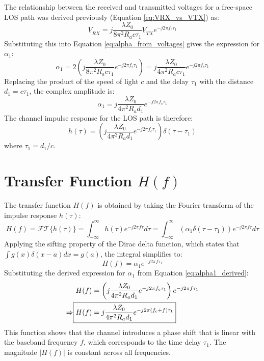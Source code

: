The relationship between the received and transmitted voltages for a free-space LOS path was derived previously (Equation \ref{eq:VRX_vs_VTX}) as:
\begin{equation}
	\underline{V}_{RX} = j \frac{\lambda Z_0}{8\pi^2 R_a c\tau_1} \underline{V}_{TX} e^{-j2\pi f_c \tau_1}
\end{equation}
Substituting this into Equation \eqref{eq:alpha_from_voltages} gives the expression for $\alpha_1$:
\begin{equation}
	\alpha_1 = 2 \left( j \frac{\lambda Z_0}{8\pi^2 R_a c\tau_1} e^{-j2\pi f_c \tau_1} \right) = j \frac{\lambda Z_0}{4\pi^2 R_a c\tau_1} e^{-j2\pi f_c \tau_1}
\end{equation}
Replacing the product of the speed of light $c$ and the delay $\tau_1$ with the distance $d_1 = c\tau_1$, the complex amplitude is:
\begin{equation}
	\alpha_1 = j \frac{\lambda Z_0}{4\pi^2 R_a d_1} e^{-j2\pi f_c \tau_1}
	\label{eq:alpha1_derived}
\end{equation}
The channel impulse response for the LOS path is therefore:
\begin{equation}
	\boxed{h(\tau) = \left( j \frac{\lambda Z_0}{4\pi^2 R_a d_1} e^{-j2\pi f_c \tau_1} \right) \delta(\tau - \tau_1)}
	\label{eq:los_impulse_response_derived_detailed}
\end{equation}
where $\tau_1 = d_1/c$.

\section{Transfer Function $H(f)$}
The transfer function $H(f)$ is obtained by taking the Fourier transform of the impulse response $h(\tau)$:
\begin{equation}
	H(f) = \mathcal{FT}\{ h(\tau)\} =  \int_{-\infty}^{\infty} h(\tau) e^{-j2\pi f \tau} d\tau = \int_{-\infty}^{\infty} \left( \alpha_1 \delta(\tau - \tau_1) \right) e^{-j2\pi f \tau} d\tau
\end{equation}
Applying the sifting property of the Dirac delta function, which states that $\int g(x)\delta(x-a)dx = g(a)$, the integral simplifies to:
\begin{equation}
	H(f) = \alpha_1 e^{-j2\pi f \tau_1}
\end{equation}
Substituting the derived expression for $\alpha_1$ from Equation \ref{eq:alpha1_derived}:
\begin{align}
	H(f) &= \left( j \frac{\lambda Z_0}{4\pi^2 R_a d_1} e^{-j2\pi f_c \tau_1} \right) e^{-j2\pi f \tau_1} \\
	\Rightarrow \Aboxed{H(f) &= j \frac{\lambda Z_0}{4\pi^2 R_a d_1} e^{-j2\pi (f_c + f) \tau_1}}
	\label{eq:los_transfer_function_detailed}
\end{align}
This function shows that the channel introduces a phase shift that is linear with the baseband frequency $f$, which corresponds to the time delay $\tau_1$. The magnitude $|H(f)|$ is constant across all frequencies.

